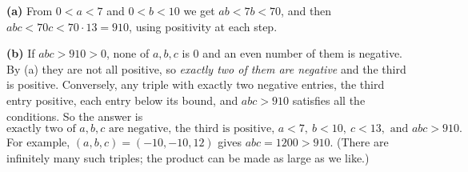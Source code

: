 \textbf{(a)} From $0<a<7$ and $0<b<10$ we get $ab<7b<70$, and then $abc<70c<70\cdot13=910$, using positivity at each step.

\textbf{(b)} If $abc>910>0$, none of $a,b,c$ is $0$ and an even number of them is negative. By (a) they are not all positive, so \emph{exactly two of them are negative} and the third is positive. Conversely, any triple with exactly two negative entries, the third entry positive, each entry below its bound, and $abc>910$ satisfies all the conditions. So the answer is
\[\boxed{\text{exactly two of }a,b,c\text{ are negative, the third is positive, }a<7,\ b<10,\ c<13,\text{ and }abc>910.}\]
For example, $(a,b,c)=(-10,-10,12)$ gives $abc=1200>910$. (There are infinitely many such triples; the product can be made as large as we like.)
